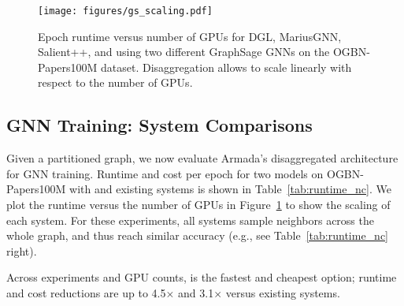 \begin{figure}[t]
  \centering
  \texttt{[image: figures/gs\_scaling.pdf]}
  \vspace{-0.15in}
  \caption{Epoch runtime versus number of GPUs for DGL, MariusGNN, Salient++, and \systemname using two different GraphSage GNNs on the OGBN-Papers100M dataset. Disaggregation allows \systemname to scale linearly with respect to the number of GPUs.}
  \vspace{-0.1in}
  \label{fig:scaling}
\end{figure}


\subsection{GNN Training: System Comparisons}
Given a partitioned graph, we now evaluate Armada's disaggregated architecture for GNN training. Runtime and cost per epoch for two models on OGBN-Papers100M with \systemname and existing systems is shown in Table~\ref{tab:runtime_nc}. We plot the runtime versus the number of GPUs in Figure~\ref{fig:scaling} to show the scaling of each system. 
For these experiments, all systems sample neighbors across the whole graph, and thus reach similar accuracy (e.g., see Table~\ref{tab:runtime_nc} right).


Across experiments and GPU counts, \systemname is the fastest and cheapest option; runtime and cost reductions are up to 4.5$\times$ and 3.1$\times$ versus existing systems. 



